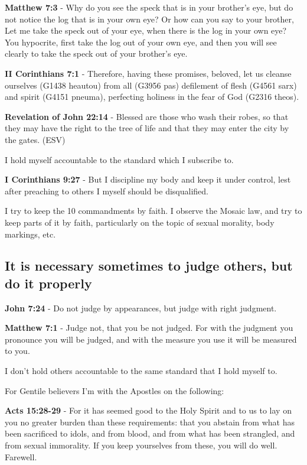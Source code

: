 \documentclass[11pt]{article}
\begin{document}
\textbf{Matthew 7:3} - Why do you see the speck that is in your brother's eye, but do not notice the log that is in your own eye?  Or how can you say to your brother, Let me take the speck out of your eye, when there is the log in your own eye?  You hypocrite, first take the log out of your own eye, and then you will see clearly to take the speck out of your brother's eye.

\textbf{II Corinthians 7:1} - Therefore, having these promises, beloved, let us cleanse ourselves (G1438 heautou) from all (G3956 pas) defilement of flesh (G4561 sarx) and spirit (G4151 pneuma), perfecting holiness in the fear of God (G2316 theos).

\textbf{Revelation of John 22:14} - Blessed are those who wash their robes, so that they may have the right to the tree of life and that they may enter the city by the gates. (ESV)

I hold myself accountable to the standard which I subscribe to.

\textbf{I Corinthians 9:27} - But I discipline my body and keep it under control, lest after preaching to others I myself should be disqualified.

I try to keep the 10 commandments by faith.
I observe the Mosaic law, and try to keep parts of it by faith, particularly
on the topic of sexual morality, body markings, etc.

\subsection{It is necessary sometimes to judge others, but do it properly}
\label{sec:orgb0350b7}
\textbf{John 7:24} - Do not judge by appearances, but judge with right judgment.

\textbf{Matthew 7:1} - Judge not, that you be not judged.  For with the judgment you pronounce you will be judged, and with the measure you use it will be measured to you.

I don't hold others accountable to the same standard that I hold myself to.

For Gentile believers I'm with the Apostles on the following:

\textbf{Acts 15:28-29} - For it has seemed good to the Holy Spirit and to us to lay on you no greater burden than these requirements: that you abstain from what has been sacrificed to idols, and from blood, and from what has been strangled, and from sexual immorality. If you keep yourselves from these, you will do well. Farewell.
\end{document}
